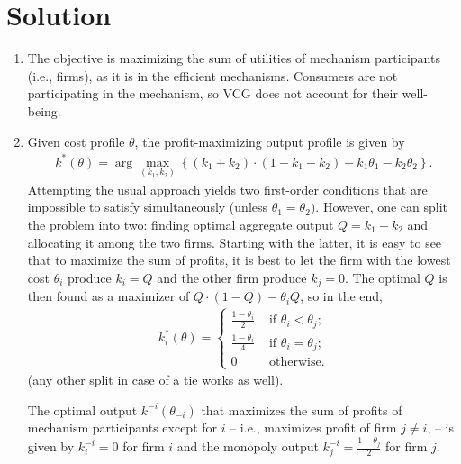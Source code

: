 \documentclass[a4paper]{article}
\newif\ifsolutions
\begin{document}
\ifsolutions
\section*{Solution}
\begin{enumerate}
	\item The objective is maximizing the sum of utilities of mechanism participants (i.e., firms), as it is in the efficient mechanisms. Consumers are not participating in the mechanism, so VCG does not account for their well-being.
	\item Given cost profile $\theta$, the profit-maximizing output profile is given by
	\begin{align*}
		k^*(\theta) = \arg \max_{(k_1,k_2)} \left\{ (k_1 + k_2) \cdot (1 - k_1 - k_2) - k_1 \theta_1 - k_2 \theta_2 \right\}.
	\end{align*}
	Attempting the usual approach yields two first-order conditions that are impossible to satisfy simultaneously (unless $\theta_1 = \theta_2)$.
	However, one can split the problem into two: finding optimal aggregate output $Q = k_1 + k_2$ and allocating it among the two firms. Starting with the latter, it is easy to see that to maximize the sum of profits, it is best to let the firm with the lowest cost $\theta_i$ produce $k_i = Q$ and the other firm produce $k_j = 0$.	
	The optimal $Q$ is then found as a maximizer of $Q\cdot (1-Q) - \theta_i Q$, so in the end,
	\begin{align*}
		k_i^*(\theta) =
		\begin{cases}
			\frac{1-\theta_i}{2} & \text{ if } \theta_i < \theta_j;
			\\
			\frac{1-\theta_i}{4} & \text{ if } \theta_i = \theta_j;
			\\
			0 & \text{ otherwise.}
		\end{cases}
	\end{align*}
	(any other split in case of a tie works as well).
	
	The optimal output $k^{-i}(\theta_{-i})$ that maximizes the sum of profits of mechanism participants except for $i$ -- i.e., maximizes profit of firm $j\neq i$, -- is given by $k^{-i}_i = 0$ for firm $i$ and the monopoly output $k^{-i}_j = \frac{1-\theta_j}{2}$ for firm $j$.
	

\end{enumerate}
\end{document}

